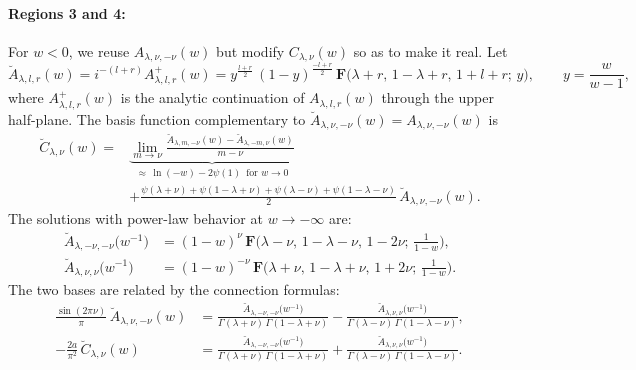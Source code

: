 \documentclass[12pt]{article}
\newcommand{\hgfs}{\mathbf{F}}
\newcommand{\bA}{\breve{A}}
\newcommand{\bC}{\breve{C}}
\begin{document}
\paragraph{Regions 3 and 4:} For $w<0$, we reuse $A_{\lambda,\nu,-\nu}(w)$ but modify $C_{\lambda,\nu}(w)$ so as to make it real. Let
\begin{equation} \label{bAf}
\bA_{\lambda,l,r}(w)=i^{-(l+r)}A^{+}_{\lambda,l,r}(w)
=y^{\frac{l+r}{2}}\,(1-y)^{\frac{-l+r}{2}}\,
\hgfs\bigl(\lambda+r,\,1-\lambda+r,\,1+l+r;\, y\bigr),\qquad y=\frac{w}{w-1},
\end{equation}
where $A^{+}_{\lambda,l,r}(w)$ is the analytic continuation of $A_{\lambda,l,r}(w)$ through the upper half-plane. The basis function complementary to $\bA_{\lambda,\nu,-\nu}(w)=A_{\lambda,\nu,-\nu}(w)$ is
\begin{equation}
\begin{aligned} \label{bCf}
\bC_{\lambda,\nu}(w)={}&
\underbrace{\lim_{m\to\nu}
\frac{\bA_{\lambda,m,-\nu}(w)-\bA_{\lambda,-m,\nu}(w)}{m-\nu}}
_{\approx\,\ln(-w)-2\psi(1)\, \text{ for } w\to 0}\\[2pt]
&+\frac{\psi(\lambda+\nu)+\psi(1-\lambda+\nu)
+\psi(\lambda-\nu)+\psi(1-\lambda-\nu)}{2}\,\bA_{\lambda,\nu,-\nu}(w).
\end{aligned}
\end{equation}
The solutions with power-law behavior at $w\to-\infty$ are:
\begin{equation}
\begin{aligned}
\bA_{\lambda,-\nu,-\nu} \big( w^{-1} \big)
&=(1-w)^{\nu}\,\hgfs\big(\lambda-\nu,\,1-\lambda-\nu,\,1-2\nu;\,
\tfrac{1}{1-w}\big),\\[3pt]
\bA_{\lambda,\nu,\nu} \bigl( w^{-1} \bigr)
&=(1-w)^{-\nu}\,\hgfs\bigl(\lambda+\nu,\,1-\lambda+\nu,\,1+2\nu;\,
\tfrac{1}{1-w}\bigr).
\end{aligned}
\end{equation}
The two bases are related by the connection formulas:
\begin{equation}
\begin{aligned}
\frac{\sin(2\pi\nu)}{\pi}\,\bA_{\lambda,\nu,-\nu}(w)
&=\frac{\bA_{\lambda,-\nu,-\nu}\big(w^{-1}\big)}
{\Gamma(\lambda+\nu)\,\Gamma(1-\lambda+\nu)}
-\frac{\bA_{\lambda,\nu,\nu}\big(w^{-1}\big)}
{\Gamma(\lambda-\nu)\,\Gamma(1-\lambda-\nu)},
\\[3pt]
-\frac{2a}{\pi^2}\,\bC_{\lambda,\nu}(w)
&=\frac{\bA_{\lambda,-\nu,-\nu}\big(w^{-1}\big)}
{\Gamma(\lambda+\nu)\,\Gamma(1-\lambda+\nu)}
+\frac{\bA_{\lambda,\nu,\nu}\big(w^{-1}\big)}
{\Gamma(\lambda-\nu)\,\Gamma(1-\lambda-\nu)}.
\end{aligned}
\end{equation}
\end{document}
